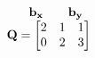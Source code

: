 \documentclass[preview]{standalone}
\begin{document}
\begin{align*}
\begin{array}{ccc}\begin{matrix}\hspace{1cm} \mathbf{b_{x}}  & & \mathbf{b_{y}} \hspace{0.6cm} \end{matrix} \\ \mathbf{Q} = \begin{bmatrix} 2 & 1 & 1 \\ 0 & 2 & 3 \end{bmatrix} \end{array}
\end{align*}
\end{document}
